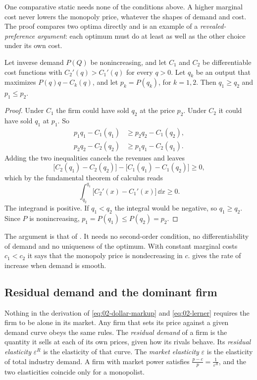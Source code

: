 One comparative static needs none of the conditions above. A higher marginal cost never lowers the monopoly price,
whatever the shapes of demand and cost. The proof compares two optima directly and is an example of a
\emph{revealed-preference argument}: each optimum must do at least as well as the other choice under its own cost.

\begin{lemma}\label{lem:02-monotone}
Let inverse demand $P(Q)$ be nonincreasing, and let $C_1$ and $C_2$ be differentiable cost functions with
$C_2'(q) > C_1'(q)$ for every $q > 0$. Let $q_k$ be an output that maximizes $P(q)q - C_k(q)$, and let
$p_k = P(q_k)$, for $k = 1, 2$. Then $q_1 \ge q_2$ and $p_1 \le p_2$.
\end{lemma}

\begin{proof}
Under $C_1$ the firm could have sold $q_2$ at the price $p_2$. Under $C_2$ it could have sold $q_1$ at $p_1$. So
\begin{align*}
  p_1q_1 - C_1(q_1) &\ge p_2q_2 - C_1(q_2), \\
  p_2q_2 - C_2(q_2) &\ge p_1q_1 - C_2(q_1) .
\end{align*}
Adding the two inequalities cancels the revenues and leaves
\[
  \bigl[C_2(q_1) - C_2(q_2)\bigr] - \bigl[C_1(q_1) - C_1(q_2)\bigr] \ge 0 ,
\]
which by the fundamental theorem of calculus reads
\[
  \int_{q_2}^{q_1}\bigl[C_2'(x) - C_1'(x)\bigr]\,\dd x \ge 0 .
\]
The integrand is positive. If $q_1 < q_2$ the integral would be negative, so $q_1 \ge q_2$. Since $P$ is
nonincreasing, $p_1 = P(q_1) \le P(q_2) = p_2$.
\end{proof}

The argument is that of \citet[sec.~1.1.1.1, eqs.~(1.2) to (1.5)]{Tirole1988}. It needs no second-order condition,
no differentiability of demand and no uniqueness of the optimum. With constant marginal costs $c_1 < c_2$ it says
that the monopoly price is nondecreasing in $c$.  gives the rate of increase when demand
is smooth.

\subsection{Residual demand and the dominant firm}\label{sec:02-residual}

Nothing in the derivation of \eqref{eq:02-dollar-markup} and \eqref{eq:02-lerner} requires the firm to be alone in
its market. Any firm that sets its price against a given demand curve obeys the same rules. The \emph{residual
demand} of a firm is the quantity it sells at each of its own prices, given how its rivals behave. Its
\emph{residual elasticity} $\varepsilon^R$ is the elasticity of that curve. The \emph{market elasticity}
$\varepsilon$ is the elasticity of total industry demand. A firm with market power satisfies
$\frac{p - c}{p} = \frac{1}{\varepsilon^R}$, and the two elasticities coincide only for a monopolist.

